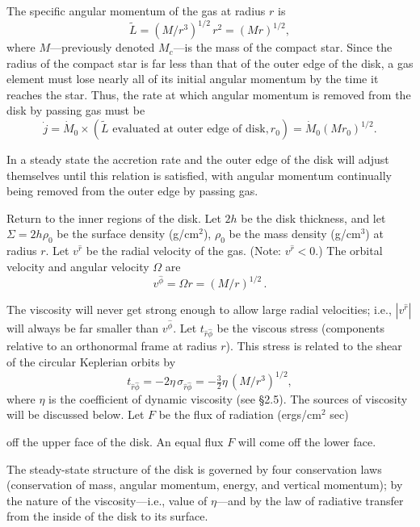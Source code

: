 The specific angular momentum of the gas at radius $r$ is
\begin{equation}
\tilde{L} = (M/r^3)^{1/2}\,r^2 = (Mr)^{1/2},
\tag{5.2.12}
\end{equation}
where $M$---previously denoted $M_c$---is the mass of the compact star. Since the
radius of the compact star is far less than that of the outer edge of the disk, a gas
element must lose nearly all of its initial angular momentum by the time it reaches
the star. Thus, the rate at which angular momentum is removed from the disk by
passing gas must be
\begin{equation}
\dot{j} = \dot{M}_0 \times (\tilde{L} \text{ evaluated at outer edge of disk}, r_0)
= \dot{M}_0 (Mr_0)^{1/2}.
\tag{5.2.13}
\end{equation}

In a steady state the accretion rate and the outer edge of the disk will adjust
themselves until this relation is satisfied, with angular momentum continually
being removed from the outer edge by passing gas.

Return to the inner regions of the disk. Let $2h$
be the disk thickness, and let $\Sigma = 2h\rho_0$ be the surface density (g/cm$^2$),
$\rho_0$ be the mass density (g/cm$^3$) at radius
$r$. Let $v^{\hat{r}}$ be the radial velocity of the gas. (Note: $v^{\hat{r}} < 0$.) The orbital velocity
and angular velocity $\Omega$ are
\begin{equation}
v^{\hat{\phi}} = \Omega r = (M/r)^{1/2}\,.
\tag{5.2.14}
\end{equation}

The viscosity will never get strong enough to allow large radial velocities; i.e.,
$|v^{\hat{r}}|$ will always be far smaller than $v^{\hat{\phi}}$. Let $t_{\hat{r}\hat{\phi}}$ be the viscous stress (components
relative to an orthonormal frame at radius $r$). This stress is related to the shear
of the circular Keplerian orbits by
\begin{equation}
t_{\hat{r}\hat{\phi}} = -2\eta\,\sigma_{\hat{r}\hat{\phi}}
= -\tfrac{3}{2}\eta\,(M/r^3)^{1/2},
\tag{5.2.16}
\end{equation}
where $\eta$ is the coefficient of dynamic viscosity (see \S2.5). The sources of
viscosity will be discussed below. Let $F$ be the flux of radiation (ergs/cm$^2$ sec)

off the upper face of the disk. An equal flux $F$ will come off the lower face.

The steady-state structure of the disk is governed by four conservation laws
(conservation of mass, angular momentum, energy, and vertical momentum);
by the nature of the viscosity---i.e., value of $\eta$---and by the law of radiative transfer
from the inside of the disk to its surface.

